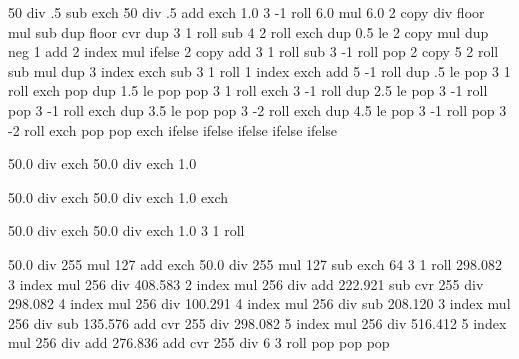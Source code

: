   {\pgfpoint{0bp}{0bp}}
  {\pgfpoint{100bp}{100bp}}{}{
  50 div .5 sub  %
  exch 50 div .5 add exch %
  1.0 %
  3 -1 roll %
  6.0 mul %
  6.0 2 copy div floor mul sub %
  dup %
  floor cvr %
  dup %
  3 1 roll sub %
  4 2 roll exch %
  dup 0.5 le %
  { 2 copy mul }
  { dup neg 1 add 2 index mul }
  ifelse %
  2 copy %
  add %
  3 1 roll %
  sub %
  3 -1 roll pop %
  2 copy %
  5 2 roll %
  sub mul dup %
  3 index exch sub %
  3 1 roll %
  1 index exch add %
  5 -1 roll %
  dup .5 le %
  {
    pop %
    3 1 roll %
    exch pop %
  }
  { dup 1.5 le %
    {
      pop pop %
      3 1 roll %
      exch %
      3 -1 roll %
    }
    { dup 2.5 le %
      {
        pop %
        3 -1 roll pop %
        3 -1 roll exch %
      }
      { dup 3.5 le %
        {
          pop pop %
          3 -2 roll %
          exch %
        }
        { dup 4.5 le %
          {
            pop %
            3 -1 roll %
            pop %
            3 -2 roll %
            exch %
          }
          {
            pop %
            pop %
            exch %
          }
          ifelse
        }
        ifelse %
      }
      ifelse %
    }
    ifelse %
  }
  ifelse %
}

  {\pgfpoint{0bp}{0bp}}
  {\pgfpoint{50bp}{50bp}}{}{
  50.0 div exch
  50.0 div exch
  1.0
}

  {\pgfpoint{0bp}{0bp}}
  {\pgfpoint{50bp}{50bp}}{}{
  50.0 div exch
  50.0 div exch
  1.0 exch
}

  {\pgfpoint{0bp}{0bp}}
  {\pgfpoint{50bp}{50bp}}{}{
  50.0 div exch
  50.0 div exch
  1.0
  3 1 roll
}

  {\pgfpoint{-50bp}{-50bp}}
  {\pgfpoint{50bp}{50bp}}{}{
  50.0 div 255 mul 127 add exch
  50.0 div 255 mul 127 sub exch
  64
  3 1 roll %
  298.082 3 index mul 256 div
  408.583 2 index mul 256 div add
  222.921 sub cvr 255 div %
  298.082 4 index mul 256 div
  100.291 4 index mul 256 div sub
  208.120 3 index mul 256 div sub
  135.576 add cvr 255 div %
  298.082 5 index mul 256 div
  516.412 5 index mul 256 div add
  276.836 add cvr 255 div %
  6 3 roll pop pop pop
}


